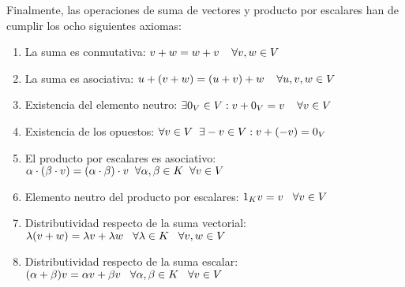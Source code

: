 \documentclass[12pt]{article}
\begin{document}
\vspace{2mm}
Finalmente, las operaciones de suma de vectores y producto por escalares han de cumplir los ocho siguientes axiomas:
\begin{enumerate}[label = E.\arabic*)]
    \item La suma es conmutativa: \hspace{2mm}
        $v + w = w + v \hspace{4mm} \forall v,w \in V$
    \item La suma es asociativa: \hspace{2mm}
        $u + (v + w) = (u + v) + w \hspace{4mm} \forall u,v,w \in V$
    \item Existencia del elemento neutro: \hspace{2mm}
        $\exists 0_V \in V : v + 0_V = v \hspace{4mm} \forall v \in V$
    \item Existencia de los opuestos: \hspace{2mm}
        $\forall v \in V \hspace{2mm} \exists -v \in V : 
            v + (-v) = 0_V$
    \item El producto por escalares es asociativo: \hspace{1mm}
        $\alpha \cdot (\beta \cdot v) = (\alpha \cdot  \beta) \cdot v
            \hspace{2mm} \forall \alpha, \beta \in K
            \hspace{2mm} \forall v \in V$
    \item Elemento neutro del producto por escalares: \hspace{2mm}
        $1_K v = v \hspace{3mm} \forall v \in V$   
    \item Distributividad respecto de la suma vectorial:\\
        $\lambda(v + w) = \lambda v + \lambda w \hspace{3mm}
            \forall \lambda \in K \hspace{3mm} \forall v,w \in V$
    \item Distributividad respecto de la suma escalar: \\
        $(\alpha + \beta)v = \alpha v + \beta v \hspace{3mm}
            \forall \alpha, \beta \in K \hspace{3mm} \forall v \in V$
\end{enumerate}
\end{document}
